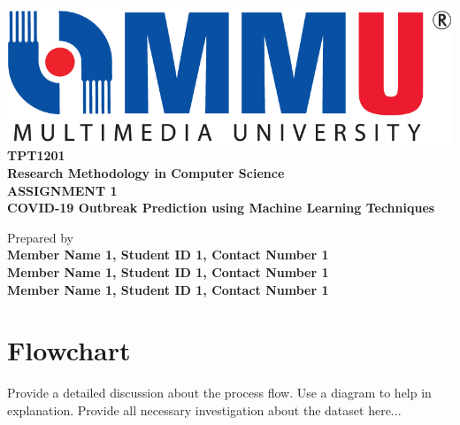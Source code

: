 \documentclass[12pt,a4paper,oneside]{article}
\begin{document}
\begin{center}

\includegraphics[scale=0.30]{mmu.png}\\
\vspace{1cm}
\Large{\textbf{TPT1201 \\Research Methodology in Computer Science}} \\
\vspace{2.5cm}
\Large{\textbf{ASSIGNMENT 1}} \\
\vspace{1cm}
\Large{\textbf{COVID-19 Outbreak Prediction using Machine Learning Techniques}} \\
\vspace{1cm}
 


\vspace{6.5cm}


\normalsize{Prepared by} \\
\vspace{2.5cm}
\large{\textbf{Member Name 1, Student ID 1, Contact Number 1}} \\ 
\large{\textbf{Member Name 1, Student ID 1, Contact Number 1}} \\ 
\large{\textbf{Member Name 1, Student ID 1, Contact Number 1}} \\ 
 

\end{center}

\thispagestyle{empty}
 
\clearpage 


\section{Flowchart}

Provide a detailed discussion about the process flow. Use a diagram to help in explanation. Provide all necessary investigation about the dataset here...
\end{document}

